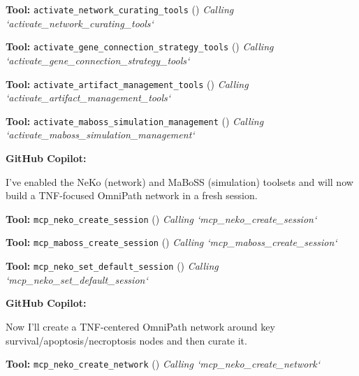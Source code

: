 \documentclass[11pt,a4paper]{article}
\begin{document}
\begin{toolokbox}
\textbf{Tool:} \texttt{activate\_network\_curating\_tools} (\checkmark)
\textit{Calling `activate\_network\_curating\_tools`}
\end{toolokbox}
\begin{toolokbox}
\textbf{Tool:} \texttt{activate\_gene\_connection\_strategy\_tools} (\checkmark)
\textit{Calling `activate\_gene\_connection\_strategy\_tools`}
\end{toolokbox}
\begin{toolokbox}
\textbf{Tool:} \texttt{activate\_artifact\_management\_tools} (\checkmark)
\textit{Calling `activate\_artifact\_management\_tools`}
\end{toolokbox}
\begin{toolokbox}
\textbf{Tool:} \texttt{activate\_maboss\_simulation\_management} (\checkmark)
\textit{Calling `activate\_maboss\_simulation\_management`}
\end{toolokbox}
\begin{copilotbox}
\textbf{GitHub Copilot:}

I’ve enabled the NeKo (network) and MaBoSS (simulation) toolsets and will now build a TNF-focused OmniPath network in a fresh session.

\end{copilotbox}
\begin{toolokbox}
\textbf{Tool:} \texttt{mcp\_neko\_create\_session} (\checkmark)
\textit{Calling `mcp\_neko\_create\_session`}
\end{toolokbox}
\begin{toolokbox}
\textbf{Tool:} \texttt{mcp\_maboss\_create\_session} (\checkmark)
\textit{Calling `mcp\_maboss\_create\_session`}
\end{toolokbox}
\begin{toolokbox}
\textbf{Tool:} \texttt{mcp\_neko\_set\_default\_session} (\checkmark)
\textit{Calling `mcp\_neko\_set\_default\_session`}
\end{toolokbox}
\begin{copilotbox}
\textbf{GitHub Copilot:}

Now I'll create a TNF-centered OmniPath network around key survival/apoptosis/necroptosis nodes and then curate it.

\end{copilotbox}
\begin{toolokbox}
\textbf{Tool:} \texttt{mcp\_neko\_create\_network} (\checkmark)
\textit{Calling `mcp\_neko\_create\_network`}
\end{toolokbox}
\end{document}
